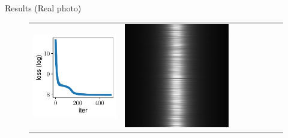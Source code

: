 \documentclass[final]{beamer}
\newlength{\twocolwid}
\newlength{\resultwidth}
\begin{document}
\begin{frame}[t]
\begin{columns}[t]
\begin{column}{\twocolwid}
\begin{block}{Results (Real photo)}
\begin{figure}[t]
\begin{tabular}{ccrclccc}
            		\includegraphics[width=\resultwidth]{real/metal/loss.pdf} &
            		\includegraphics[width=\resultwidth]{real/metal/optim.jpg} &

\end{tabular}
\end{figure}
\end{block}
\end{column}
\end{columns}
\end{frame}
\end{document}
